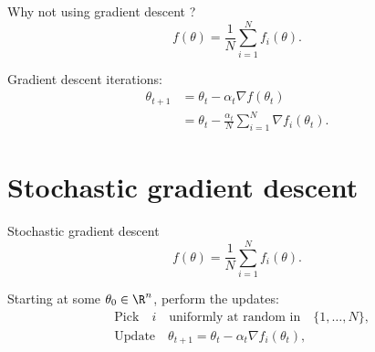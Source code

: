 \documentclass{beamer}
\begin{document}
\begin{frame}[t]{Why not using gradient descent ?}
	\grid
	$$
	f(\theta) = \frac{1}{N} \sum_{i=1}^N f_i(\theta).
	$$
	\vspace{-0.8cm}
	\begin{exampleblock}{}
		Gradient descent iterations:
\begin{align*}
	\theta_{t+1} 
	&= \theta_t - \alpha_t \nabla f(\theta_t) 
	\\
	&= \theta_t - \frac{\alpha_t}{N} \sum_{i=1}^N \nabla f_i(\theta_t).
\end{align*}
\vspace{-0.5cm}
	\end{exampleblock}

\end{frame}

\section{Stochastic gradient descent}

\begin{frame}[t]{Stochastic gradient descent}
	\grid
	$$
	f(\theta) = \frac{1}{N} \sum_{i=1}^N f_i(\theta).
	$$
	\vspace{-0.6cm}
	\begin{exampleblock}{}
		Starting at some $\theta_0 \in \R^n$, perform the updates:
\begin{align*}
	&\text{Pick} \quad i \quad \text{uniformly at random in} \quad \{1, \dots, N\}, \\
	&\text{Update} \quad \theta_{t+1} = \theta_t - \alpha_t \nabla f_i(\theta_t),
\end{align*}
	\end{exampleblock}

\end{frame}
\end{document}

